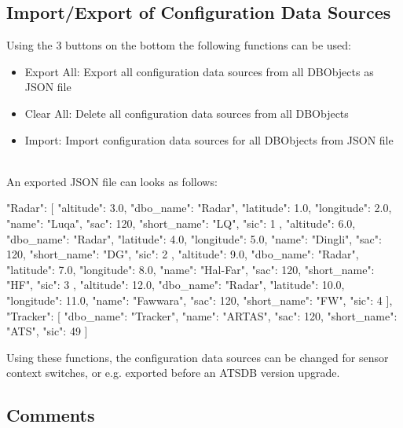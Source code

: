 \subsection{Import/Export of Configuration Data Sources}
\label{sec:config_ds_export}

Using the 3 buttons on the bottom the following functions can be used:

\begin{itemize}  
\item Export All: Export all configuration data sources from all DBObjects as JSON file
\item Clear All: Delete all configuration data sources from all DBObjects
\item Import: Import configuration data sources for all DBObjects from JSON file
\end{itemize}
\ \\

An exported JSON file can looks as follows:

\begin{cverbatim}
{
    "Radar": [
        {
            "altitude": 3.0,
            "dbo_name": "Radar",
            "latitude": 1.0,
            "longitude": 2.0,
            "name": "Luqa",
            "sac": 120,
            "short_name": "LQ",
            "sic": 1
        },
        {
            "altitude": 6.0,
            "dbo_name": "Radar",
            "latitude": 4.0,
            "longitude": 5.0,
            "name": "Dingli",
            "sac": 120,
            "short_name": "DG",
            "sic": 2
        },
        {
            "altitude": 9.0,
            "dbo_name": "Radar",
            "latitude": 7.0,
            "longitude": 8.0,
            "name": "Hal-Far",
            "sac": 120,
            "short_name": "HF",
            "sic": 3
        },
        {
            "altitude": 12.0,
            "dbo_name": "Radar",
            "latitude": 10.0,
            "longitude": 11.0,
            "name": "Fawwara",
            "sac": 120,
            "short_name": "FW",
            "sic": 4
        }
    ],
    "Tracker": [
        {
            "dbo_name": "Tracker",
            "name": "ARTAS",
            "sac": 120,
            "short_name": "ATS",
            "sic": 49
        }
    ]
}
\end{cverbatim}

Using these functions, the configuration data sources can be changed for sensor context switches, or e.g. exported before an ATSDB version upgrade.

\subsection{Comments}

